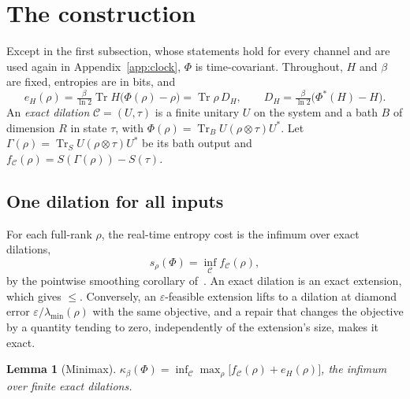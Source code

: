 \documentclass[11pt]{article}
\newtheorem{lemma}[theorem]{Lemma}
\theoremstyle{definition}
\theoremstyle{remark}
\newcommand{\Tr}{\operatorname{Tr}}
\newcommand{\Trt}{\kappa_\beta}
\newcommand{\Dil}{\mathcal C}
\begin{document}
\appendix
\section{The construction}\label{app:construction}

Except in the first subsection, whose statements hold for every channel and are used again in Appendix~\ref{app:clock}, $\Phi$ is time-covariant. Throughout, $H$ and $\beta$ are fixed, entropies are in bits, and
\[
e_H(\rho)=\tfrac{\beta}{\ln2}\Tr H\bigl(\Phi(\rho)-\rho\bigr)=\Tr\rho\,D_H,\qquad D_H=\tfrac{\beta}{\ln2}\bigl(\Phi^*(H)-H\bigr).
\]
An \emph{exact dilation} $\Dil=(U,\tau)$ is a finite unitary $U$ on the system and a bath $B$ of dimension $R$ in state $\tau$, with $\Phi(\rho)=\Tr_BU(\rho\otimes\tau)U^*$. Let $\Gamma(\rho)=\Tr_SU(\rho\otimes\tau)U^*$ be its bath output and $f_{\Dil}(\rho)=S(\Gamma(\rho))-S(\tau)$.

\subsection{One dilation for all inputs}

For each full-rank $\rho$, the real-time entropy cost is the infimum over exact dilations,
\begin{equation}\label{eq:pointwise}
s_\rho(\Phi)=\inf_{\Dil} f_{\Dil}(\rho),
\end{equation}
by the pointwise smoothing corollary of~\cite{ClosedMemory}. An exact dilation is an exact extension, which gives $\le$. Conversely, an $\varepsilon$-feasible extension lifts to a dilation at diamond error $\varepsilon/\lambda_{\min}(\rho)$ with the same objective, and a repair that changes the objective by a quantity tending to zero, independently of the extension's size, makes it exact.

\begin{lemma}[Minimax]\label{lem:minimax}
$\Trt(\Phi)=\inf_{\Dil}\max_\rho\bigl[f_{\Dil}(\rho)+e_H(\rho)\bigr]$, the infimum over finite exact dilations.
\end{lemma}
\end{document}
